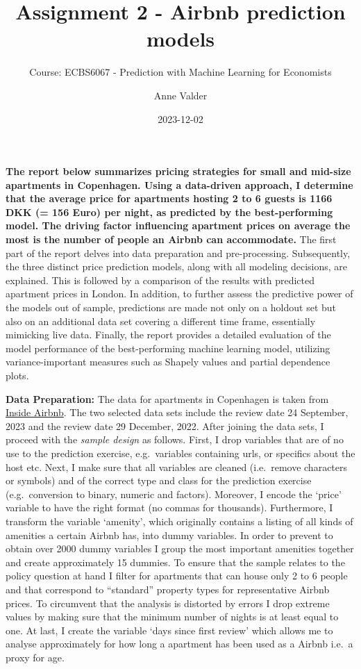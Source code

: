 \documentclass[
]{article}
\title{Assignment 2 - Airbnb prediction models}
\subtitle{Course: ECBS6067 - Prediction with Machine Learning for
Economists}
\author{Anne Valder}
\date{2023-12-02}
\begin{document}
\maketitle

\textbf{The report below summarizes pricing strategies for small and
mid-size apartments in Copenhagen. Using a data-driven approach, I
determine that the average price for apartments hosting 2 to 6 guests is
1166 DKK (= 156 Euro) per night, as predicted by the best-performing
model. The driving factor influencing apartment prices on average the
most is the number of people an Airbnb can accommodate.} The first part
of the report delves into data preparation and pre-processing.
Subsequently, the three distinct price prediction models, along with all
modeling decisions, are explained. This is followed by a comparison of
the results with predicted apartment prices in London. In addition, to
further assess the predictive power of the models out of sample,
predictions are made not only on a holdout set but also on an additional
data set covering a different time frame, essentially mimicking live
data. Finally, the report provides a detailed evaluation of the model
performance of the best-performing machine learning model, utilizing
variance-important measures such as Shapely values and partial
dependence plots.

\textbf{Data Preparation:} The data for apartments in Copenhagen is
taken from \href{http://insideairbnb.com/get-the-data/}{Inside Airbnb}.
The two selected data sets include the review date 24 September, 2023
and the review date 29 December, 2022. After joining the data sets, I
proceed with the \emph{sample design} as follows. First, I drop
variables that are of no use to the prediction exercise, e.g.~variables
containing urls, or specifics about the host etc. Next, I make sure that
all variables are cleaned (i.e.~remove characters or symbols) and of the
correct type and class for the prediction exercise (e.g.~conversion to
binary, numeric and factors). Moreover, I encode the `price' variable to
have the right format (no commas for thousands). Furthermore, I
transform the variable `amenity', which originally contains a listing of
all kinds of amenities a certain Airbnb has, into dummy variables. In
order to prevent to obtain over 2000 dummy variables I group the most
important amenities together and create approximately 15 dummies. To
ensure that the sample relates to the policy question at hand I filter
for apartments that can house only 2 to 6 people and that correspond to
``standard'' property types for representative Airbnb prices. To
circumvent that the analysis is distorted by errors I drop extreme
values by making sure that the minimum number of nights is at least
equal to one. At last, I create the variable `days since first review'
which allows me to analyse approximately for how long a apartment has
been used as a Airbnb i.e.~a proxy for age.
\end{document}
